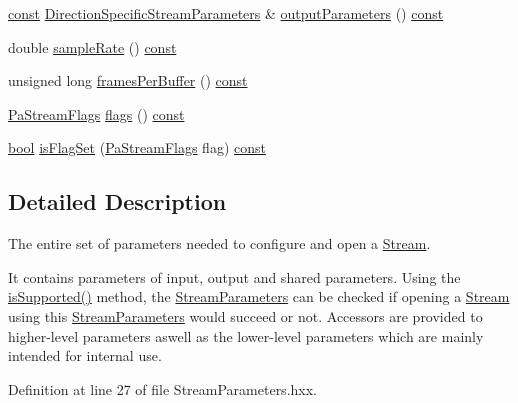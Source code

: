 \begin{DoxyCompactItemize}
\hyperlink{getopt1_8c_a2c212835823e3c54a8ab6d95c652660e}{const} \hyperlink{classportaudio_1_1_direction_specific_stream_parameters}{Direction\+Specific\+Stream\+Parameters} \& \hyperlink{classportaudio_1_1_stream_parameters_aa833c40a257af218e542dc03ad03ff22}{output\+Parameters} () \hyperlink{getopt1_8c_a2c212835823e3c54a8ab6d95c652660e}{const} 
\item 
double \hyperlink{classportaudio_1_1_stream_parameters_ace4fd8d5746ff6d6f664eefd50cb01c0}{sample\+Rate} () \hyperlink{getopt1_8c_a2c212835823e3c54a8ab6d95c652660e}{const} 
\item 
unsigned long \hyperlink{classportaudio_1_1_stream_parameters_a537f89fa6f1fcc750bad7cb961bb44ab}{frames\+Per\+Buffer} () \hyperlink{getopt1_8c_a2c212835823e3c54a8ab6d95c652660e}{const} 
\item 
\hyperlink{portaudio_8h_a37c7ac3ace7d2dd1430f40ecdee4ebb6}{Pa\+Stream\+Flags} \hyperlink{classportaudio_1_1_stream_parameters_a24de4bfc9080fc2f664a0e0e9e895197}{flags} () \hyperlink{getopt1_8c_a2c212835823e3c54a8ab6d95c652660e}{const} 
\item 
\hyperlink{mac_2config_2i386_2lib-src_2libsoxr_2soxr-config_8h_abb452686968e48b67397da5f97445f5b}{bool} \hyperlink{classportaudio_1_1_stream_parameters_a947dae05bb5f1cbad291c992804b1ec1}{is\+Flag\+Set} (\hyperlink{portaudio_8h_a37c7ac3ace7d2dd1430f40ecdee4ebb6}{Pa\+Stream\+Flags} flag) \hyperlink{getopt1_8c_a2c212835823e3c54a8ab6d95c652660e}{const} 
\end{DoxyCompactItemize}


\subsection{Detailed Description}
The entire set of parameters needed to configure and open a \hyperlink{classportaudio_1_1_stream}{Stream}. 

It contains parameters of input, output and shared parameters. Using the \hyperlink{classportaudio_1_1_stream_parameters_a28f58707bd5ea1091db8513d0f7fa7ac}{is\+Supported()} method, the \hyperlink{classportaudio_1_1_stream_parameters}{Stream\+Parameters} can be checked if opening a \hyperlink{classportaudio_1_1_stream}{Stream} using this \hyperlink{classportaudio_1_1_stream_parameters}{Stream\+Parameters} would succeed or not. Accessors are provided to higher-\/level parameters aswell as the lower-\/level parameters which are mainly intended for internal use. 

Definition at line 27 of file Stream\+Parameters.\+hxx.



